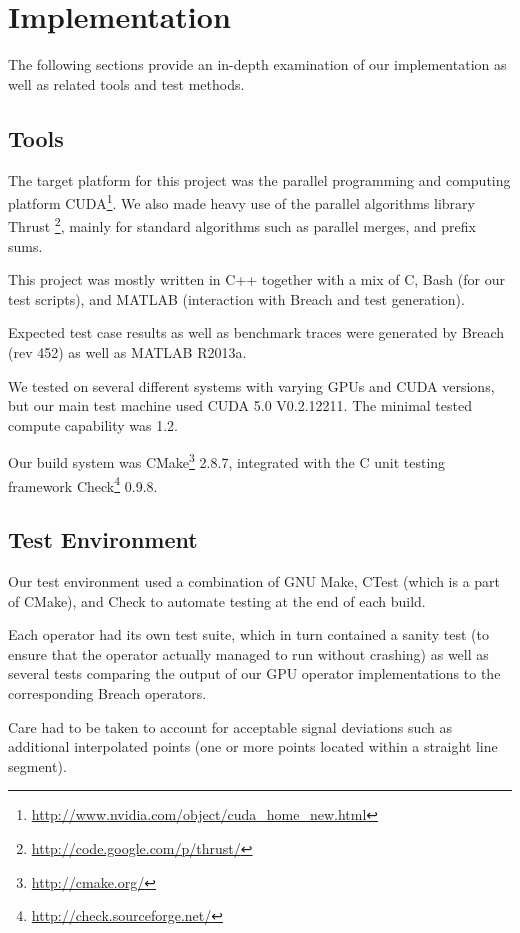 \documentclass[a4paper,10pt]{article}
\begin{document}
\section{Implementation}

The following sections provide an in-depth examination of our implementation
as well as related tools and test methods.

\subsection{Tools}

The target platform for this project was the parallel programming and computing platform CUDA\footnote{\url{http://www.nvidia.com/object/cuda_home_new.html}}.
We also made heavy use of the parallel algorithms library Thrust \footnote{\url{http://code.google.com/p/thrust/}}, mainly for standard algorithms such as parallel merges, and prefix sums.

This project was mostly written in C++ together with a mix of C, Bash (for our test scripts), and MATLAB (interaction with Breach and test generation).

Expected test case results as well as benchmark traces were generated by Breach (rev 452) as well as MATLAB R2013a.

We tested on several different systems with varying GPUs and CUDA versions, but
our main test machine used CUDA 5.0 V0.2.12211. The minimal tested compute capability
was 1.2.

Our build system was CMake\footnote{\url{http://cmake.org/}} 2.8.7, integrated with the
C unit testing framework Check\footnote{\url{http://check.sourceforge.net/}} 0.9.8.

\subsection{Test Environment}

Our test environment used a combination of GNU Make, CTest (which is a part of CMake), and Check to automate testing at the end of each build.

Each operator had its own test suite, which in turn contained a sanity test (to ensure that the operator actually managed to run without crashing) as well as
several tests comparing the output of our GPU operator implementations to the
corresponding Breach operators.

Care had to be taken to account for acceptable signal deviations such as additional
interpolated points (one or more points located within a straight line segment).
\end{document}
